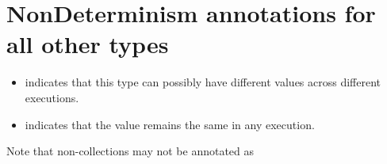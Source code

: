 \section{NonDeterminism annotations for all other types\label{nondeterminism-annotations-elements}}

\begin{itemize}
\item
   indicates
  that this type can possibly have different values across different executions. 
 \item
   indicates that
  the value remains the same in any execution.
\end{itemize}

Note that non-collections may not be annotated as 


